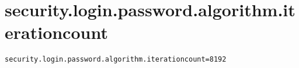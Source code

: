 \section{security.login.password.algorithm.iterationcount}
\label{configuration:SecurityLoginPasswordAlgorithmIterationcount}
\ClearAPI
\TODO
{}
\begin{lstlisting}[style=Props,caption={Usage example for \textit{security.login.password.algorithm.iterationcount}}]
security.login.password.algorithm.iterationcount=8192
\end{lstlisting}